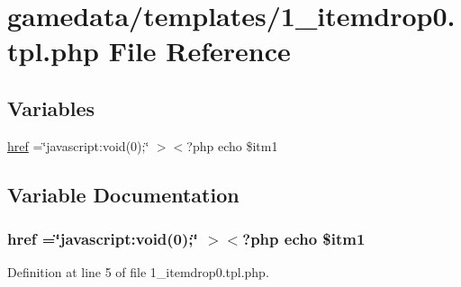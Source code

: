 \hypertarget{1__itemdrop0_8tpl_8php}{\section{gamedata/templates/1\+\_\+itemdrop0.tpl.\+php File Reference}
\label{1__itemdrop0_8tpl_8php}
}
\subsection*{Variables}
\begin{DoxyCompactItemize}
\item 
\hyperlink{1__itemdrop0_8tpl_8php_aecfca4286e302d5d945be6fe76b99c86}{href} =\char`\"{}javascript\+:void(0);\char`\"{} $>$$<$?php echo \$itm1
\end{DoxyCompactItemize}


\subsection{Variable Documentation}
\hypertarget{1__itemdrop0_8tpl_8php_aecfca4286e302d5d945be6fe76b99c86}{
\subsubsection[{href}]{\setlength{\rightskip}{0pt plus 5cm}href =\char`\"{}javascript\+:void(0);\char`\"{} $>$$<$?php echo \$itm1}}\label{1__itemdrop0_8tpl_8php_aecfca4286e302d5d945be6fe76b99c86}


Definition at line 5 of file 1\+\_\+itemdrop0.\+tpl.\+php.


